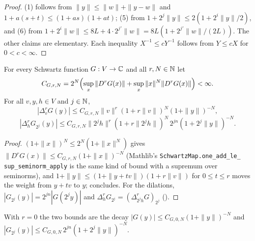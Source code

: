 \begin{proof}
\leanok
(1) follows from $\|y\| \leq \|w\| + \|y - w\|$ and
$1 + a (s + t) \leq (1 + a s)(1 + a t)$; (5) from $1 + 2^j \|y\| \leq 2 (1 + 2^i \|y\| / 2)$, and
(6) from $1 + 2^i \|w\| \leq 8 L + 4 \cdot 2^{j'} \|w\| = 8 L (1 + 2^{j'} \|w\| / (2 L))$. The
other claims are elementary. Each inequality $X^{-1} \leq c Y^{-1}$ follows from $Y \leq c X$
for $0 < c < \infty$.
\end{proof}

\begin{lemma}
\label{lem:schwartz-decay}
\leanok
{}
For every Schwartz function $G : V \to \mathbb{C}$ and all $r, N \in \mathbb{N}$ let
\[
  C_{G,r,N} = 2^N \Bigl( \sup_x \|D^r G(x)\| + \sup_x \|x\|^N \|D^r G(x)\| \Bigr) < \infty .
\]
For all $v, y, h \in V$ and $j \in \mathbb{N}$,
\[
  |\Delta_v^r G(y)| \leq C_{G,r,N} \|v\|^r (1 + r \|v\|)^N (1 + \|y\|)^{-N},
\]
\[
  |\Delta_h^r G_{2^j}(y)| \leq C_{G,r,N} \|2^j h\|^r (1 + r \|2^j h\|)^N \, 2^{jn}
  (1 + 2^j \|y\|)^{-N} .
\]
\end{lemma}

\begin{proof}
\leanok
$(1 + \|x\|)^N \leq 2^N (1 + \|x\|^N)$ gives $\|D^r G(x)\| \leq C_{G,r,N} (1 + \|x\|)^{-N}$
(Mathlib's \texttt{SchwartzMap.\allowbreak one\_\allowbreak add\_\allowbreak le\_\allowbreak
sup\_\allowbreak seminorm\_\allowbreak apply} is the same kind of bound with a supremum over
seminorms), and $1 + \|y\| \leq (1 + \|y + t v\|)(1 + r \|v\|)$ for $0 \leq t \leq r$ moves the
weight from $y + t v$ to $y$;  concludes. For the dilations,
$|G_{2^j}(y)| = 2^{jn} |G(2^j y)|$ and $\Delta_h^r G_{2^j} = (\Delta_{2^j h}^r G)_{2^j}$
().
\end{proof}

With $r = 0$ the two bounds are the decay $|G(y)| \leq C_{G,0,N} (1 + \|y\|)^{-N}$ and
$|G_{2^j}(y)| \leq C_{G,0,N} \, 2^{jn} (1 + 2^j \|y\|)^{-N}$.

